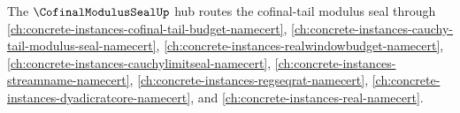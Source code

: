 The $\CofinalModulusSealUp$ hub routes the cofinal-tail modulus seal through \autoref{ch:concrete-instances-cofinal-tail-budget-namecert}, \autoref{ch:concrete-instances-cauchy-tail-modulus-seal-namecert}, \autoref{ch:concrete-instances-realwindowbudget-namecert}, \autoref{ch:concrete-instances-cauchylimitseal-namecert}, \autoref{ch:concrete-instances-streamname-namecert}, \autoref{ch:concrete-instances-regseqrat-namecert}, \autoref{ch:concrete-instances-dyadicratcore-namecert}, and \autoref{ch:concrete-instances-real-namecert}.



